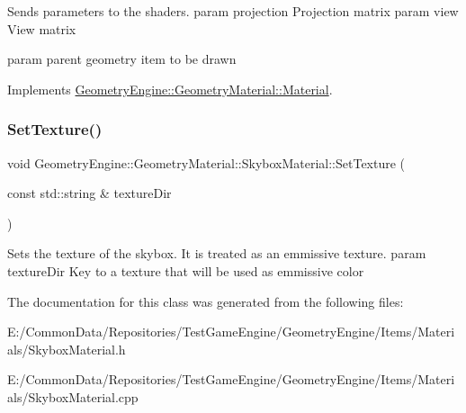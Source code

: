 Sends parameters to the shaders. param projection Projection matrix param view View matrix

param parent geometry item to be drawn 

Implements \mbox{\hyperlink{class_geometry_engine_1_1_geometry_material_1_1_material_a68310797df53062f237d0005fbcfce7e}{Geometry\+Engine\+::\+Geometry\+Material\+::\+Material}}.

\mbox{\label{class_geometry_engine_1_1_geometry_material_1_1_skybox_material_a8abf2f8ba43b6c17e31b3c82a958744f}} 
\subsubsection{\texorpdfstring{SetTexture()}{SetTexture()}}
{\footnotesize\ttfamily void Geometry\+Engine\+::\+Geometry\+Material\+::\+Skybox\+Material\+::\+Set\+Texture (\begin{DoxyParamCaption}\item[{const std\+::string \&}]{texture\+Dir }\end{DoxyParamCaption})}

Sets the texture of the skybox. It is treated as an emmissive texture. param texture\+Dir Key to a texture that will be used as emmissive color 

The documentation for this class was generated from the following files\+:\begin{DoxyCompactItemize}
\item 
E\+:/\+Common\+Data/\+Repositories/\+Test\+Game\+Engine/\+Geometry\+Engine/\+Items/\+Materials/Skybox\+Material.\+h\item 
E\+:/\+Common\+Data/\+Repositories/\+Test\+Game\+Engine/\+Geometry\+Engine/\+Items/\+Materials/Skybox\+Material.\+cpp\end{DoxyCompactItemize}

